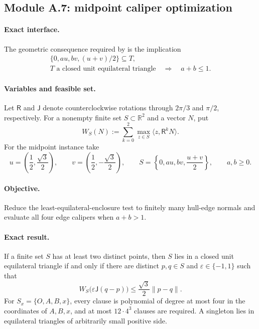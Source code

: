 \subsection{Module A.7: midpoint caliper optimization}
\label{subsec:finite-caliper}

\paragraph{Exact interface.}
The geometric consequence required by  is the
implication
\[
 \begin{gathered}
 \{0,au,bv,(u+v)/2\}\subseteq T,\\
 T\text{ a closed unit equilateral triangle}
 \quad\Longrightarrow\quad a+b\le1.
 \end{gathered}
\]

\paragraph{Variables and feasible set.}
Let $\mathsf R$ and $\mathsf J$ denote counterclockwise rotations through
$2\pi/3$ and $\pi/2$, respectively.  For a nonempty finite set
$S\subset\mathbb R^2$ and a vector $N$, put
\begin{equation}
 W_S(N):=\sum_{k=0}^2
 \max_{z\in S}\langle z,\mathsf R^kN\rangle.
 \label{eq:caliper-support-sum}
\end{equation}
For the midpoint instance take
\[
 u=\left(\frac12,\frac{\sqrt3}{2}\right),
 \qquad
 v=\left(\frac12,-\frac{\sqrt3}{2}\right),
 \qquad
 S=\left\{0,au,bv,\frac{u+v}{2}\right\},
 \qquad a,b\ge0.
\]

\paragraph{Objective.}
Reduce the least-equilateral-enclosure test to finitely many hull-edge
normals and evaluate all four edge calipers when $a+b>1$.

\paragraph{Exact result.}

\begin{theorem}
\label{thm:cert-caliper}
If a finite set $S$ has at least two distinct points, then $S$ lies in a
closed unit equilateral triangle if and only if there are distinct $p,q\in S$
and $\varepsilon\in\{-1,1\}$ such that
\begin{equation}
 W_S\bigl(\varepsilon\mathsf J(q-p)\bigr)
 \le\frac{\sqrt3}{2}\lVert p-q\rVert.
 \label{eq:finite-caliper-test}
\end{equation}
For $S_x=\{O,A,B,x\}$, every clause is polynomial of degree at most four in
the coordinates of $A,B,x$, and at most $12\cdot4^3$ clauses are required.
A singleton lies in equilateral triangles of arbitrarily small positive side.
\end{theorem}

